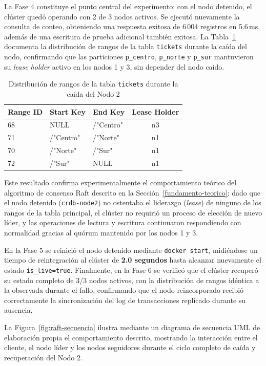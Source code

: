\documentclass[12pt, a4paper]{article}
\begin{document}
La Fase 4 constituye el punto central del experimento: con el nodo detenido, el clúster quedó operando con 2 de 3 nodos activos. Se ejecutó nuevamente la consulta de conteo, obteniendo una respuesta exitosa de 6\,004 registros en 5.6\,ms, además de una escritura de prueba adicional también exitosa. La Tabla~\ref{tab:rangos-fallo} documenta la distribución de rangos de la tabla \texttt{tickets} durante la caída del nodo, confirmando que las particiones \texttt{p\_centro}, \texttt{p\_norte} y \texttt{p\_sur} mantuvieron su \textit{lease holder} activo en los nodos 1 y 3, sin depender del nodo caído.

\begin{table}[H]
\centering
\caption{Distribución de rangos de la tabla \texttt{tickets} durante la caída del Nodo 2}
\label{tab:rangos-fallo}
\begin{tabular}{@{}lllc@{}}
\toprule
\textbf{Range ID} & \textbf{Start Key} & \textbf{End Key} & \textbf{Lease Holder} \\
\midrule
68 & NULL      & /"Centro" & n3 \\
71 & /"Centro" & /"Norte"  & n1 \\
70 & /"Norte"  & /"Sur"    & n1 \\
72 & /"Sur"    & NULL      & n1 \\
\bottomrule
\end{tabular}
\end{table}

Este resultado confirma experimentalmente el comportamiento teórico del algoritmo de consenso Raft descrito en la Sección~\ref{fundamento-teorico}: dado que el nodo detenido (\texttt{crdb-node2}) no ostentaba el liderazgo (\textit{lease}) de ninguno de los rangos de la tabla principal, el clúster no requirió un proceso de elección de nuevo líder, y las operaciones de lectura y escritura continuaron respondiendo con normalidad gracias al quórum mantenido por los nodos 1 y 3.

En la Fase 5 se reinició el nodo detenido mediante \texttt{docker start}, midiéndose un tiempo de reintegración al clúster de \textbf{2.0 segundos} hasta alcanzar nuevamente el estado \texttt{is\_live=true}. Finalmente, en la Fase 6 se verificó que el clúster recuperó su estado completo de 3/3 nodos activos, con la distribución de rangos idéntica a la observada durante el fallo, confirmando que el nodo reincorporado recibió correctamente la sincronización del log de transacciones replicado durante su ausencia.

La Figura~\ref{fig:raft-secuencia} ilustra mediante un diagrama de secuencia UML de elaboración propia el comportamiento descrito, mostrando la interacción entre el cliente, el nodo líder y los nodos seguidores durante el ciclo completo de caída y recuperación del Nodo 2.
\end{document}
